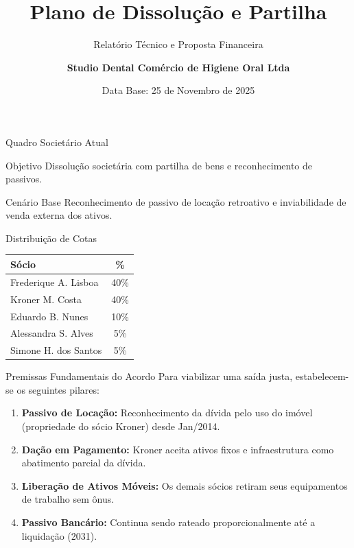 \documentclass[10pt, aspectratio=169, squeeze]{beamer}
\title{Plano de Dissolução e Partilha}
\subtitle{Relatório Técnico e Proposta Financeira}
\author{\textbf{Studio Dental Comércio de Higiene Oral Ltda}}
\date{Data Base: 25 de Novembro de 2025}
\begin{document}
\maketitle

\begin{frame}{Quadro Societário Atual}
    \begin{block}{Objetivo}
        Dissolução societária com partilha de bens e reconhecimento de passivos.
    \end{block}
    
    \vspace{0.5cm}
    
    \begin{alertblock}{Cenário Base}
        Reconhecimento de passivo de locação retroativo e inviabilidade de venda externa dos ativos.
    \end{alertblock}
\end{frame}

\begin{frame}{Distribuição de Cotas}
    \centering
    \begin{table}
        \begin{tabular}{l c}
            \toprule
            \textbf{Sócio} & \textbf{\%} \\
            \midrule
            Frederique A. Lisboa & 40\% \\
            Kroner M. Costa & 40\% \\
            Eduardo B. Nunes & 10\% \\
            Alessandra S. Alves & 5\% \\
            Simone H. dos Santos & 5\% \\
            \bottomrule
        \end{tabular}
    \end{table}
\end{frame}

\begin{frame}{Premissas Fundamentais do Acordo}
    Para viabilizar uma saída justa, estabelecem-se os seguintes pilares:
    \vspace{0.5cm}
    \begin{enumerate}
        \item \textbf{Passivo de Locação:} Reconhecimento da dívida pelo uso do imóvel (propriedade do sócio Kroner) desde Jan/2014.
        \item \textbf{Dação em Pagamento:} Kroner aceita ativos fixos e infraestrutura como abatimento parcial da dívida.
        \item \textbf{Liberação de Ativos Móveis:} Os demais sócios retiram seus equipamentos de trabalho sem ônus.
        \item \textbf{Passivo Bancário:} Continua sendo rateado proporcionalmente até a liquidação (2031).
    \end{enumerate}
\end{frame}
\end{document}
